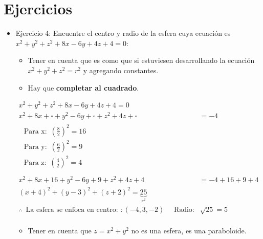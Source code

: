 \section{Ejercicios}
\begin{itemize}
    \item  Ejercicio 4: Encuentre el centro y radio de la esfera cuya ecuación es $x^2+y^2+z^2+8x-6y+4z+4=0$:
        \begin{itemize}
            \item Tener en cuenta que es como que si estuviesen desarrollando la ecuación $x^2+y^2+z^2=r^2$ y agregando constantes.
            \item Hay que \textbf{completar al cuadrado}.
        \end{itemize}

        \begin{align*}
            x^2+y^2+z^2+8x-6y+4z+4=0 \\ 
            x^2+8x+\square+y^2-6y+\square+z^2+4z+\square&=-4 \\ 
            \begin{matrix}
                \text{  Para x:  }\, \left(\frac{8}{2}\right)^2 = 16 \\ 
                \text{  Para y:  }\, \left( \frac{6}{2}  \right)^2 = 9 \\ 
                \text{  Para z:  }\, \left(\frac{4}{2}\right)^2 = 4 \\ 
            \end{matrix} \\ 
            x^2+8x+16+y^2-6y+9+z^2+4z+4&= -4 +16+9+4\\
            (x+4)^2+(y-3)^2+(z+2)^2= \underbrace{25}_{r^2} \\ 
            \therefore \, \text{  La esfera se enfoca en centro:  }: (-4,3,-2) \quad \text{  Radio:  } \, \sqrt[]{25}=5 \\ 
        \end{align*}
        
        \begin{itemize}
            \item Tener en cuenta que $z=x^2+y^2$ no es una esfera, es una paraboloide.
        \end{itemize}
    

\end{itemize}

